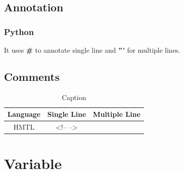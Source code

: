 \documentclass[12pt, a4paper]{report}
\begin{document}
	\subsection{Annotation}
	    \subsubsection{Python}
	    It uses \textbf{\#} to annotate single line and \textbf{'''} for multiple lines.

	\subsection{Comments}
	\begin{table}[H]
	    \centering
	    \begin{tabular}{c|c|c}
	        \toprule
	        Language & Single Line & Multiple Line \\
	        \hline
	        HMTL & <!-- -->  & \\
	        \bottomrule
	    \end{tabular}
	    \caption{Caption}
	    \label{tab:my_label}
	\end{table}
	
	

\section{Variable}
\end{document}
